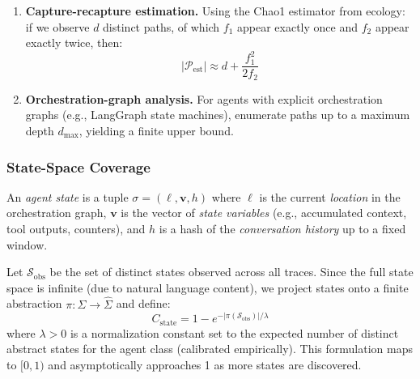 \begin{enumerate}[leftmargin=*]
  \item \textbf{Capture-recapture estimation.} Using the Chao1 estimator
    from ecology: if we observe $d$ distinct paths, of which $f_1$ appear
    exactly once and $f_2$ appear exactly twice, then:
    \begin{equation}
    \label{eq:chao1}
      |\mathcal{P}_{\text{est}}| \approx d + \frac{f_1^2}{2 f_2}
    \end{equation}

  \item \textbf{Orchestration-graph analysis.} For agents with explicit
    orchestration graphs (e.g., LangGraph state machines), enumerate paths
    up to a maximum depth $d_{\max}$, yielding a finite upper bound.
\end{enumerate}

\subsubsection{State-Space Coverage}
\label{sec:coverage:state}

\begin{definition}
\label{def:agent-state}
An \emph{agent state} is a tuple $\sigma = (\ell, \mathbf{v}, h)$ where
$\ell$ is the current \emph{location} in the orchestration graph,
$\mathbf{v}$ is the vector of \emph{state variables} (e.g., accumulated
context, tool outputs, counters), and $h$ is a hash of the
\emph{conversation history} up to a fixed window.
\end{definition}

\begin{definition}
\label{def:state-coverage}
Let $\mathcal{S}_{\text{obs}}$ be the set of distinct states observed
across all traces. Since the full state space is infinite (due to
natural language content), we project states onto a finite abstraction
$\pi: \Sigma \to \hat{\Sigma}$ and define:
\begin{equation}
\label{eq:state-coverage}
  C_{\text{state}} = 1 - e^{-|\pi(\mathcal{S}_{\text{obs}})| / \lambda}
\end{equation}
where $\lambda > 0$ is a normalization constant set to the expected
number of distinct abstract states for the agent class (calibrated
empirically). This formulation maps to $[0, 1)$ and asymptotically
approaches 1 as more states are discovered.
\end{definition}

